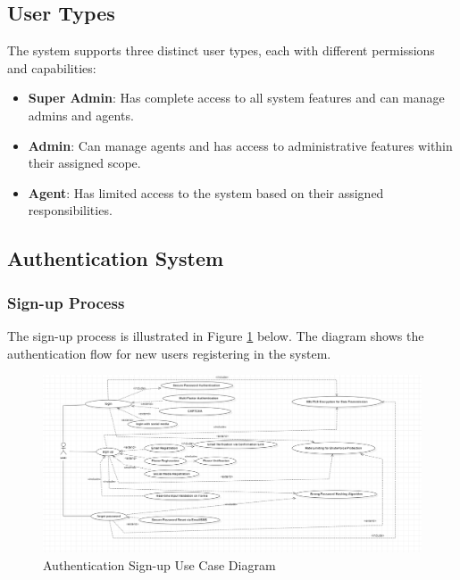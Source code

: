 \subsection{User Types}
The system supports three distinct user types, each with different permissions and capabilities:
\begin{itemize}
    \item \textbf{Super Admin}: Has complete access to all system features and can manage admins and agents.
    \item \textbf{Admin}: Can manage agents and has access to administrative features within their assigned scope.
    \item \textbf{Agent}: Has limited access to the system based on their assigned responsibilities.
\end{itemize}


\subsection{Authentication System}
\subsubsection{Sign-up Process}
The sign-up process is illustrated in Figure \ref{fig:signup-diagram} below. The diagram shows the authentication flow for new users registering in the system.

\begin{figure}[ht!]
    \centering
    \includegraphics[width=1\textwidth]{images/diagram_de_case_d_utilisation_signup.png}
    \caption{Authentication Sign-up Use Case Diagram}
    \label{fig:signup-diagram}
\end{figure}

\newpage

